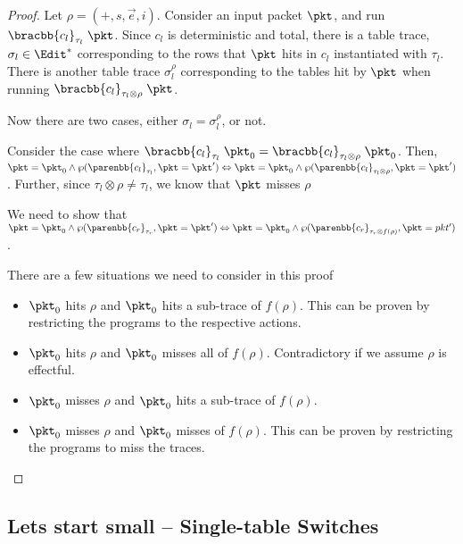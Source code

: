 \begin{proof}
  Let $\rho = (+, s, \vec e, i)$. Consider an input packet $\pkt$, and
  run $\bracbb{c_l}_{\tau_l}\; \pkt$. Since $c_l$ is deterministic and
  total, there is a table trace, $\sigma_l \in \Edit^*$ corresponding
  to the rows that $\pkt$ hits in $c_l$ instantiated with
  $\tau_l$. There is another table trace $\sigma_l^\rho$ corresponding
  to the tables hit by $\pkt$ when running
  $\bracbb{c_l}_{\tau_l \otimes \rho}\; \pkt$.

  Now there are two cases, either $\sigma_l = \sigma_l^\rho$, or not.



  Consider the case where
  $\bracbb{c_l}_{\tau_l}\; \pkt_0 = \bracbb{c_l}_{\tau_l \otimes \rho}
  \; \pkt_0$. Then,
  $\pkt = \pkt_0 \wedge \wp(\parenbb{c_l}_{\tau_l}, \pkt = \pkt')
  \Leftrightarrow \pkt = \pkt_0 \wedge \wp(\parenbb{c_l}_{\tau_l
    \otimes \rho}, \pkt = \pkt')$. Further, since
  $\tau_l \otimes \rho \neq \tau_l$, we know that $\pkt$ misses
  $\rho$


  We need to show that
  $\pkt = \pkt_0 \wedge \wp(\parenbb{c_r}_{\tau_r}, \pkt = \pkt')
  \Leftrightarrow \pkt = \pkt_0 \wedge \wp (\parenbb{c_r}_{\tau_r
    \otimes f(\rho)}, \pkt = pkt')$.


  There are a few situations we need to consider in this proof
  \begin{itemize}
  \item $\pkt_0$ hits $\rho$ and $\pkt_0$ hits a sub-trace of
    $f(\rho)$. This can be proven by restricting the programs to the
    respective actions.
    
  \item $\pkt_0$ hits $\rho$ and $\pkt_0$ misses all of
    $f(\rho)$. Contradictory if we assume $\rho$ is effectful.

  \item $\pkt_0$ misses $\rho$ and $\pkt_0$ hits a sub-trace of $f(\rho)$.
  \item $\pkt_0$ misses $\rho$ and $\pkt_0$ misses of $f(\rho)$. This
    can be proven by restricting the programs to miss the traces.
  \end{itemize}
  
\end{proof}


\subsection{Lets start small -- Single-table Switches}

